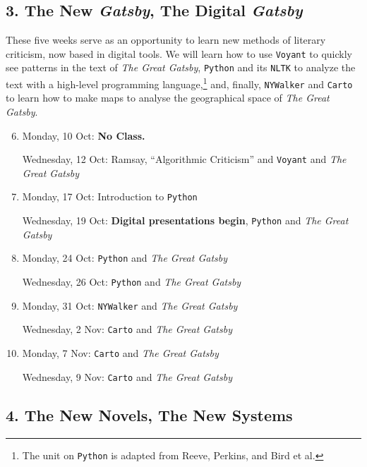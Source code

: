 \subsection*{3. The New \textit{Gatsby}, The Digital \textit{Gatsby}}

  These five weeks serve as an opportunity to learn new methods of literary
  criticism, now based in digital tools. We will learn how to use
  \texttt{Voyant} to quickly see patterns in the text of \textit{The Great
    Gatsby}, \texttt{Python} and its \texttt{NLTK} to analyze the text with a
  high-level programming language,\footnote{The unit on \texttt{Python} is
    adapted from Reeve, Perkins, and Bird et al.} and, finally,
  \texttt{NYWalker} and \texttt{Carto} to learn how to make maps to analyse the
  geographical space of \textit{The Great Gatsby}.

\begin{enumerate}
  \setcounter{enumi}{5}
 
  \item Monday, 10 Oct: \textbf{No Class.}

    Wednesday, 12 Oct: Ramsay, “Algorithmic Criticism” and \texttt{Voyant} and
    \textit{The Great Gatsby}
  
  \item Monday, 17 Oct: Introduction to \texttt{Python}

    Wednesday, 19 Oct: \textbf{\small Digital presentations begin}, \texttt{Python} and \textit{The Great Gatsby}

  \item Monday, 24 Oct: \texttt{Python} and \textit{The Great Gatsby}

    Wednesday,  26 Oct: \texttt{Python} and \textit{The Great Gatsby}

  \item Monday, 31 Oct: \texttt{NYWalker} and \textit{The Great Gatsby}

    Wednesday, 2 Nov: \texttt{Carto} and \textit{The Great Gatsby}

  \item Monday, 7 Nov: \texttt{Carto} and \textit{The Great Gatsby}

    Wednesday, 9 Nov: \texttt{Carto} and \textit{The Great Gatsby}

\end{enumerate}

\subsection*{4. The New Novels, The New Systems}

